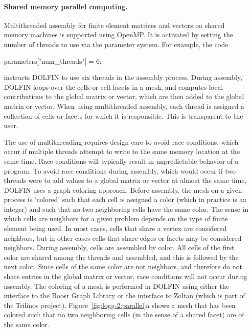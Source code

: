 \paragraph{Shared memory parallel computing.}

Multithreaded assembly for finite element matrices and vectors on shared
memory machines is supported using OpenMP. It is activated by
setting the number of threads to use via the parameter system.
For example, the code
\begin{c++}
parameters["num_threads"] = 6;
\end{c++}
instructs DOLFIN to use six threads in the assembly process.  During
assembly, DOLFIN loops over the cells or cell facets in a mesh, and
computes local contributions to the global matrix or vector, which are
then added to the global matrix or vector. When using multithreaded
assembly, each thread is assigned a collection of cells or facets for
which it is responsible. This is transparent to the user.

\enlargethispage{10pt}

The use of multithreading requires design care to avoid race conditions,
which occur if multiple threads attempt to write to the same memory
location at the same time.  Race conditions will typically result in
unpredictable behavior of a program. To avoid race conditions during
assembly, which would occur if two threads were to add values to a global
matrix or vector at almost the same time, DOLFIN uses a graph coloring
approach.  Before assembly, the mesh on a given process is `colored'
such that each cell is assigned a color (which in practice is an integer)
and such that no two neighboring cells have the same color. The sense
in which cells are neighbors for a given problem depends on the type
of finite element being used. In most cases, cells that share a vertex
are considered neighbors, but in other cases cells that share edges or
facets may be considered neighbors. During assembly, cells are assembled
by color. All cells of the first color are shared among the threads
and assembled, and this is followed by the next color. Since cells of
the same color are not neighbors, and therefore do not share entries in the
global matrix or vector, race conditions will not occur during assembly.
The coloring of a mesh is performed in DOLFIN using either the interface
to the Boost Graph Library or the interface to Zoltan (which is part of
the Trilinos project).  Figure~\ref{fig:logg-2:parallel}a shows a mesh
that has been colored such that no two neighboring cells (in the sense
of a shared facet) are of the same color.

